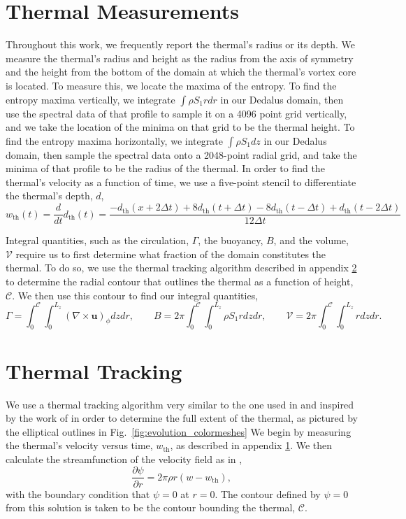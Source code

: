\documentclass[twocolumn, amsmath, amsfonts, amssymb, trackchanges]{aastex62}
\newcommand{\grad}{\ensuremath{\nabla}}
\begin{document}
\appendix
\section{Thermal Measurements}
\label{appendix:measurements}
Throughout this work, we frequently report the thermal's radius or its depth.
We measure the thermal's radius and height as the radius from the axis of symmetry and the height from the bottom of the domain at which the thermal's vortex core is located.
To measure this, we locate the maxima of the entropy.
To find the entropy maxima vertically, we integrate $\int\rho S_1 r dr$ in our Dedalus domain, then use the spectral data of that profile to sample it on a 4096 point grid vertically, and we take the location of the minima on that grid to be the thermal height.
To find the entropy maxima horizontally, we integrate $\int \rho S_1 dz$ in our Dedalus domain, then sample the spectral data onto a 2048-point radial grid, and take the minima of that profile to be the radius of the thermal.
In order to find the thermal's velocity as a function of time, we use a five-point stencil to differentiate the thermal's depth, $d$,
$$
w_{\text{th}}(t) = \frac{d }{dt}d_{\text{th}}(t) = \frac{-d_{\text{th}}(x + 2\Delta t) + 8d_{\text{th}}(t + \Delta t) - 8 d_{\text{th}}(t - \Delta t) + d_{\text{th}}(t - 2\Delta t)}{12\Delta t}
$$

Integral quantities, such as the circulation, $\Gamma$, the buoyancy, $B$, and the volume, $\mathcal{V}$ require us to first determine what fraction of the domain constitutes the thermal.
To do so, we use the thermal tracking algorithm described in appendix \ref{appendix:tracking} to determine the radial contour that outlines the thermal as a function of height, $\mathcal{C}$.
We then use this contour to find our integral quantities,
\begin{equation}
\Gamma = \int_0^{\mathcal{C}}\int_0^{L_z} (\grad\times\bm{u})_\phi dz dr, \qquad
B      = 2\pi \int_0^{\mathcal{C}}\int_0^{L_z} \rho S_1 r dz dr, \qquad
\mathcal{V} = 2\pi \int_0^{\mathcal{C}}\int_0^{L_z}r dz dr.
\end{equation}

\section{Thermal Tracking}
\label{appendix:tracking}
We use a thermal tracking algorithm very similar to the one used in  \citet{lecoanet&jeevanjee2018} and inspired by the work of \citet{romps&all2015} in order to determine the full extent of the thermal, as pictured by the elliptical outlines in Fig.~\ref{fig:evolution_colormeshes} 
We begin by measuring the thermal's velocity versus time, $w_{\text{th}}$, as described in appendix \ref{appendix:measurements}. 
We then calculate the streamfunction of the velocity field as in \citet{romps&all2015},
\begin{equation}
\frac{\partial \psi}{\partial r} = 2\pi \rho r (w - w_{\text{th}}),
\end{equation}
with the boundary condition that $\psi = 0$ at $r = 0$. 
The contour defined by $\psi = 0$ from this solution is taken to be the contour bounding the thermal, $\mathcal{C}$.
\end{document}
